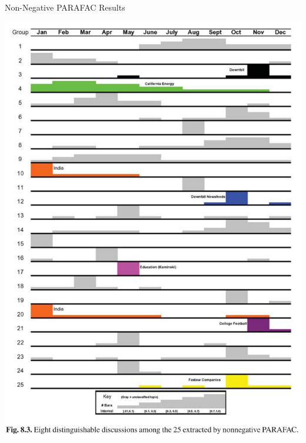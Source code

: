 \documentclass[handout]{beamer}
\begin{document}
\begin{frame}{Non-Negative PARAFAC Results}
    \begin{center}
    \includegraphics[max height=0.8\textheight]{images/enron-nn-parafac}
    \end{center}
\end{frame}
\end{document}
